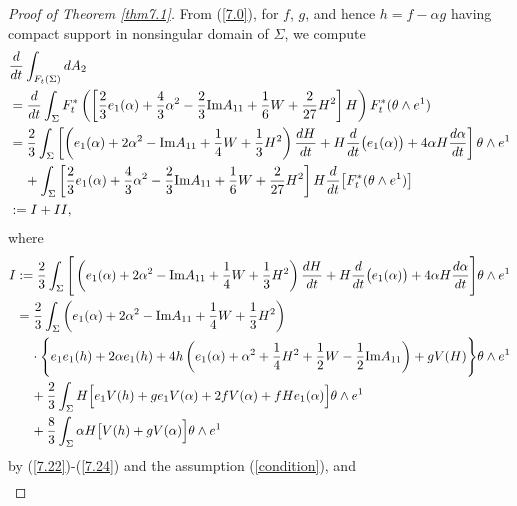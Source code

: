 \documentclass{amsart}
\theoremstyle{Corollary}
\numberwithin{equation}{section}
\begin{document}
\begin{proof}[Proof of Theorem \ref{thm7.1}]
From (\ref{7.0}), for $f$, $g$, and hence $h=f-\alpha g$ having compact support in nonsingular 
domain of $\Sigma$, we compute 
\begin{align*}
\begin{split}
&\frac{d}{dt}\int_{F_t(\Sigma)}dA_2\\
&=\frac{d}{dt}\int_\Sigma F_t^*\left(\left[\frac{2}{3}e_1(\alpha)+\frac{4}{3}\alpha^2-\frac{2}{3}\mbox{Im} A_{11}
+\frac{1}{6}W+\frac{2}{27}H^2\right]H\right)F_t^*(\theta\wedge e^1)\\
&=\frac{2}{3}\int_\Sigma \left[\left(e_1(\alpha)+2\alpha^2-\mbox{Im} A_{11}+\frac{1}{4}W+\frac{1}{3}H^2\right)\frac{dH}{dt}
+H\frac{d}{dt}\big(e_1(\alpha)\big)+4\alpha H\frac{d\alpha}{dt}\right]\theta\wedge e^1\\
&\hspace{4mm}+\int_\Sigma\left[\frac{2}{3}e_1(\alpha)+\frac{4}{3}\alpha^2-\frac{2}{3}\mbox{Im} A_{11}
+\frac{1}{6}W+\frac{2}{27}H^2\right]H\frac{d}{dt}\big[F_t^*(\theta\wedge e^1)\big]\\
&:=I+II,
\end{split}
\end{align*}
where 
\begin{align*}
\begin{split}
I&:=\frac{2}{3}\int_\Sigma \Bigg[\left(e_1(\alpha)+2\alpha^2-\mbox{Im} A_{11}+\frac{1}{4}W+\frac{1}{3}H^2\right)\frac{dH}{dt}
+H\frac{d}{dt}\big(e_1(\alpha)\big)+4\alpha H\frac{d\alpha}{dt}\Bigg]\theta\wedge e^1\\
&=\frac{2}{3}\int_\Sigma  \left(e_1(\alpha)+2\alpha^2-\mbox{Im} A_{11}+\frac{1}{4}W+\frac{1}{3}H^2\right)\\
&\hspace{4mm}\cdot \Bigg\{e_1e_1(h)+2\alpha e_1(h)+4h\left(e_1(\alpha)+\alpha^2+\frac{1}{4}H^2+\frac{1}{2}W-\frac{1}{2}\mbox{Im}A_{11}\right)
+g V(H) \Bigg\}\theta\wedge e^1\\
&\hspace{4mm}+\frac{2}{3}\int_\Sigma H\Big[e_1V(h)+ge_1V(\alpha)+2fV(\alpha)+fHe_1(\alpha)\Big]\theta\wedge e^1\\
&\hspace{4mm}+\frac{8}{3}\int_\Sigma \alpha H\big[V(h)+gV(\alpha)\Big]\theta\wedge e^1
\end{split}
\end{align*}
by (\ref{7.22})-(\ref{7.24}) and the assumption (\ref{condition}), and 
\begin{equation*}
\begin{split}

\end{split}
\end{equation*}
\end{proof}
\end{document}
